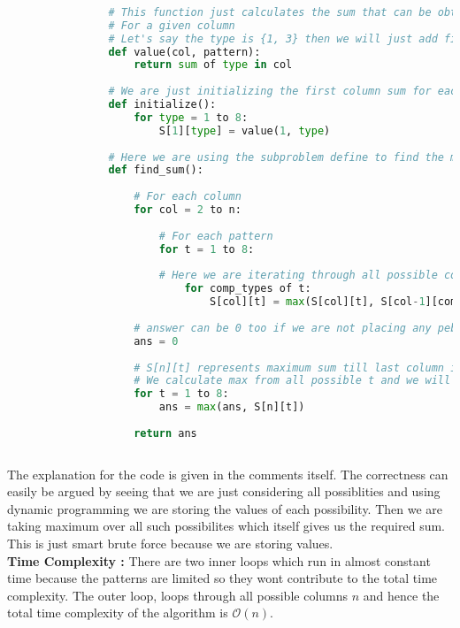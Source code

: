 \documentclass[14pt]{article}
\begin{document}
			\begin{lstlisting}[language=Python]
				
				# This function just calculates the sum that can be obtained on adding rows in set type
				# For a given column
				# Let's say the type is {1, 3} then we will just add first and third element in column "col"
				def value(col, pattern):
					return sum of type in col
				
				# We are just initializing the first column sum for each type
				def initialize():
					for type = 1 to 8:
						S[1][type] = value(1, type)
				
				# Here we are using the subproblem define to find the maximum sum for all columns
				def find_sum():
					
					# For each column
					for col = 2 to n:
						
						# For each pattern
						for t = 1 to 8:
						
						# Here we are iterating through all possible compatible types of 't'
							for comp_types of t:
								S[col][t] = max(S[col][t], S[col-1][com_types] + value(col, t));
					
					# answer can be 0 too if we are not placing any pebble
					ans = 0
					
					# S[n][t] represents maximum sum till last column if the last column was type t
					# We calculate max from all possible t and we will find the answer
					for t = 1 to 8:
						ans = max(ans, S[n][t])
					
					return ans
				
			\end{lstlisting}
			The explanation for the code is given in the comments itself. The correctness can easily be argued by seeing that we are just considering all possiblities and using dynamic programming we are storing the values of each possibility. Then we are taking maximum over all such possibilites which itself gives us the required sum. This is just smart brute force because we are storing values.\\
			\newline
			\textbf{Time Complexity : }There are two inner loops which run in almost constant time because the patterns are limited so they wont contribute to the total time complexity. The outer loop, loops through all possible columns $n$ and hence the total time complexity of the algorithm is $\mathcal{O}(n)$. 
			\newpage
\end{document}
